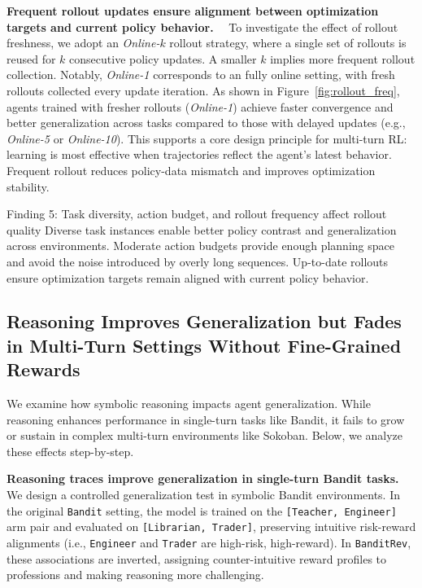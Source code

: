\noindent\textbf{Frequent rollout updates ensure alignment between optimization targets and current policy behavior.}~~
To investigate the effect of rollout freshness, we adopt an \textit{Online-\(k\)} rollout strategy, where a single set of rollouts is reused for \(k\) consecutive policy updates. A smaller \(k\) implies more frequent rollout collection. Notably, \textit{Online-1} corresponds to an fully online setting, with fresh rollouts collected every update iteration. 
As shown in Figure~\ref{fig:rollout_freq}, agents trained with fresher rollouts (\textit{Online-1}) achieve faster convergence and better generalization across tasks compared to those with delayed updates (e.g., \textit{Online-5} or \textit{Online-10}). This supports a core design principle for multi-turn RL: learning is most effective when trajectories reflect the agent’s latest behavior. Frequent rollout reduces policy-data mismatch and improves optimization stability.


\begin{onebox}{Finding 5: Task diversity,  action budget, and rollout frequency affect rollout quality}
Diverse task instances enable better policy contrast and generalization across environments.
Moderate action budgets provide enough planning space and avoid the noise introduced by overly long sequences. 
Up-to-date rollouts ensure optimization targets remain aligned with current policy behavior. 
\end{onebox}


\subsection{Reasoning Improves Generalization but Fades in Multi-Turn Settings Without Fine-Grained Rewards}

We examine how symbolic reasoning impacts agent generalization. While reasoning enhances performance in single-turn tasks like Bandit, it fails to grow or sustain in complex multi-turn environments like Sokoban. Below, we analyze these effects step-by-step.


\noindent\textbf{Reasoning traces improve generalization in single-turn Bandit tasks.}~~
We design a controlled generalization test in symbolic Bandit environments. In the original \texttt{Bandit} setting, the model is trained on the \texttt{[Teacher, Engineer]} arm pair and evaluated on \texttt{[Librarian, Trader]}, preserving intuitive risk-reward alignments (i.e., \texttt{Engineer} and \texttt{Trader} are high-risk, high-reward). In \texttt{BanditRev}, these associations are inverted, assigning counter-intuitive reward profiles to professions and making reasoning more challenging.

